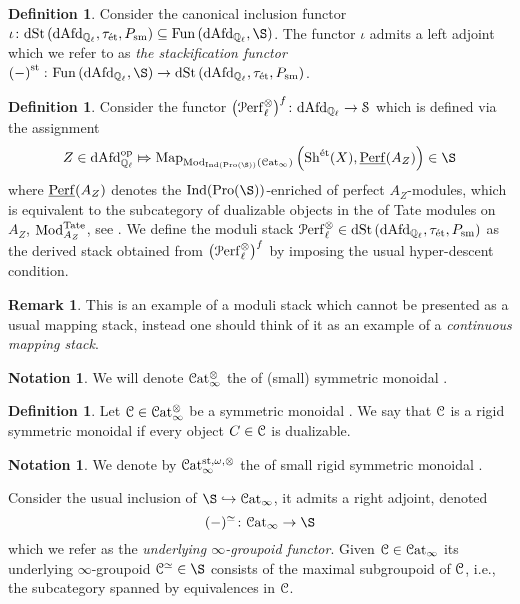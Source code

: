 \documentclass[10pt,a4paper]{amsart}
\numberwithin{equation}{subsection}
\theoremstyle{plain}
\theoremstyle{definition}
\newtheorem{defi}[theorem]{Definition}
\newtheorem{notation}[theorem]{Notation}
\newtheorem{rema}[theorem]{Remark}
\theoremstyle{remark}
\numberwithin{equation}{section}
\begin{document}
\begin{defi}
Consider the canonical inclusion functor $\iota \colon \dSt \left( \dAfdl, \tau_{\et}, P_{\sm} \right) \subseteq \Fun \left( \dAfdl, \S \right)$. The functor $\iota$ admits a left adjoint which we refer to as \emph{the stackification functor} $\left(- \right)^{\mathrm{st}} \colon
\Fun \left( \dAfdl, \S \right) 
\to \dSt \left( \dAfdl, \tau_{\et}, P_{\sm} \right)$.
\end{defi}

\begin{defi}
Consider the functor $\big( \mathcal{P} \mathrm{erf}^{\otimes}_{\ell} \big)^f  \colon \mathrm{dAfd}_{\mathbb{Q}_\ell} \to \mathcal S$ which is defined via the assignment
	\[
		Z \in \dAfdl^{\op} \Mapsto \Map_{\Mod_{\ind ( \pro(\S))} \left( \Cat \right)} \left( \Sh^{\et}(X), \underline{\mathbf{ \Perf}}(A_Z) \right) \in \S
	\]
where $\underline{\mathbf{\mathrm{Perf}}}(A_Z)
$ denotes the $\ind(\pro(\S))$-enriched \infcat of perfect $A_Z$-modules, which is equivalent to the subcategory of dualizable objects in the \infcat of Tate modules on $A_Z$, $\mathrm{Mod}^{\mathrm{Tate}}_{A_Z}$, see \cite{need reference 
here}. We define the moduli stack $\mathcal{P} \mathrm{erf}^{\otimes}_{\ell} \in \mathrm{dSt} \left( \mathrm{dAfd}_{\mathbb{Q}_\ell}, \tau_{\text{\'et}}, P_{\mathrm{sm}} \right)$ as the derived stack obtained from $\big( \mathcal{P} \mathrm{erf}^{\otimes}_{\ell} \big)^f$ by imposing the usual hyper-descent condition.
\end{defi}

\begin{rema}
This is an example of a moduli stack which cannot be presented as a usual mapping stack, instead one should think of it as an example of a \emph{continuous
mapping stack}.
\end{rema}

\begin{notation}
We will denote $\mathcal{C}\mathrm{at}_\infty^{\otimes}$ the \infcat of (small) symmetric monoidal \infcats.
\end{notation}

\begin{defi}
Let $\mathcal C \in \mathcal{C}\mathrm{at}_\infty^\otimes$ be a symmetric monoidal \infcat. We say that $\mathcal C$ is a rigid symmetric monoidal \infcat if every object $C \in \mathcal C$ is dualizable.
\end{defi}

\begin{notation} \label{rigCat}
We denote by $\mathcal{C}\mathrm{at}^{\mathrm{st}, \omega, \otimes}_{\infty}$ the \infcat of small rigid symmetric monoidal \infcats.
\end{notation}

 Consider the usual inclusion of \infcats $\S \hookrightarrow \Cat$, it admits a right adjoint, denoted
 	\[
		(-)^{\simeq} \colon \Cat \to \S
	\]
which we refer as the \emph{underlying $\infty$-groupoid functor}. Given $\mathcal C \in \mathcal{C}\mathrm{at}_\infty$ its underlying $\infty$-groupoid $\cC^{\simeq} \in \S$ consists of the maximal subgroupoid of $\mathcal C$, i.e., the subcategory spanned by equivalences in $\mathcal C$.
\end{document}
